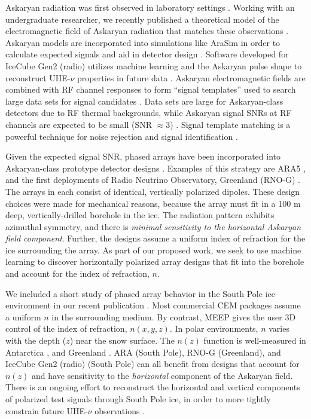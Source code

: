 \documentclass[11pt]{amsart}
\begin{document}
Askaryan radiation was first observed in laboratory settings \cite{saltzberg,10.1103/PhysRevD.74.043002,ask_ice}.  Working with an undergraduate researcher, we recently published a theoretical model of the electromagnetic field of Askaryan radiation that matches these observations \cite{PhysRevD.105.123019}. Askaryan models are incorporated into simulations like AraSim in order to calculate expected signals and aid in detector design \cite{dookayka2011characterizing,testbed,10.1140/epjc/s10052-020-7612-8}.  Software developed for IceCube Gen2 (radio) utilizes machine learning and the Askaryan pulse shape to reconstruct UHE-$\nu$ properties in future data \cite{10.1140/epjc/s10052-019-6971-5,10.1088/1748-0221/15/09/p09039,IFT}.  Askaryan electromagnetic fields are combined with RF channel responses to form ``signal templates'' used to search large data sets for signal candidates \cite{10.1088/1475-7516/2020/03/053,10.1016/j.astropartphys.2014.09.002}.  Data sets are large for Askaryan-class detectors due to RF thermal backgrounds, while  Askaryan signal SNRs at RF channels are expected to be small (SNR $\approx 3$) \cite{10.1088/1475-7516/2020/03/053,rno}.  Signal template matching is a powerful technique for noise rejection and signal identification \cite{10.1016/j.astropartphys.2015.04.002,10.1016/j.astropartphys.2014.09.002,barwick2016radio,10.1088/1475-7516/2020/03/053}. 

Given the expected signal SNR, phased arrays have been incorporated into Askaryan-class prototype detector designs \cite{Vieregg_2016,AVVA201746}.  Examples of this strategy are ARA5 \cite{PhysRevD.105.122006}, and the first deployments of Radio Neutrino Observatory, Greenland (RNO-G) \cite{rno}.  The arrays in each consist of identical, vertically polarized dipoles.  These design choices were made for mechanical reasons, because the array must fit in a 100 m deep, vertically-drilled borehole in the ice.  The radiation pattern exhibits azimuthal symmetry, and there is \textit{minimal sensitivity to the horizontal Askaryan field component}.  Further, the designs assume a uniform index of refraction for the ice surrounding the array.  As part of our proposed work, we seek to use machine learning to discover horizontally polarized array designs that fit into the borehole and account for the index of refraction, $n$.  

We included a short study of phased array behavior in the South Pole ice environment in our recent publication \cite{electronics10040415}.  Most commercial CEM packages assume a uniform $n$ in the surrounding medium.  By contrast, MEEP gives the user 3D control of the index of refraction, $n(x,y,z)$.  In polar environments, $n$ varies with the depth ($z$) near the snow surface.  The $n(z)$ function is well-measured in Antarctica \cite{horizPaper}, and Greenland \cite{deaconu_2018}.  ARA (South Pole), RNO-G (Greenland), and IceCube Gen2 (radio) (South Pole) can all benefit from designs that account for $n(z)$ and have sensitivity to the \textit{horizontal} component of the Askaryan field. There is an ongoing effort to reconstruct the horizontal and vertical components of polarized test signals through South Pole ice, in order to more tightly constrain future UHE-$\nu$ observations \cite{10.1088/1748-0221/15/09/p09039}. 
\end{document}

